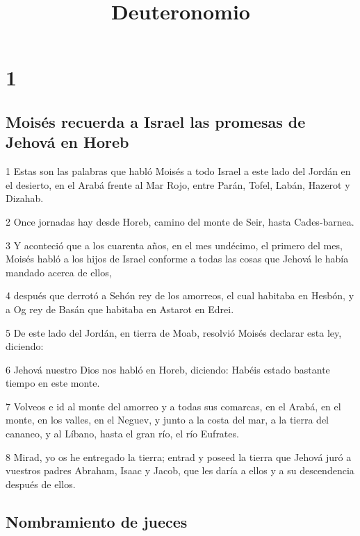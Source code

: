 

\title{Deuteronomio}

\chapter{1}

\section{Moisés recuerda a Israel las promesas de Jehová en Horeb}

\par 1 Estas son las palabras que habló Moisés a todo Israel a este lado del Jordán en el desierto, en el Arabá frente al Mar Rojo, entre Parán, Tofel, Labán, Hazerot y Dizahab.
\par 2 Once jornadas hay desde Horeb, camino del monte de Seir, hasta Cades-barnea.
\par 3 Y aconteció que a los cuarenta años, en el mes undécimo, el primero del mes, Moisés habló a los hijos de Israel conforme a todas las cosas que Jehová le había mandado acerca de ellos,
\par 4 después que derrotó a Sehón rey de los amorreos, el cual habitaba en Hesbón, y a Og rey de Basán que habitaba en Astarot en Edrei.
\par 5 De este lado del Jordán, en tierra de Moab, resolvió Moisés declarar esta ley, diciendo:
\par 6 Jehová nuestro Dios nos habló en Horeb, diciendo: Habéis estado bastante tiempo en este monte.
\par 7 Volveos e id al monte del amorreo y a todas sus comarcas, en el Arabá, en el monte, en los valles, en el Neguev, y junto a la costa del mar, a la tierra del cananeo, y al Líbano, hasta el gran río, el río Eufrates.
\par 8 Mirad, yo os he entregado la tierra; entrad y poseed la tierra que Jehová juró a vuestros padres Abraham, Isaac y Jacob, que les daría a ellos y a su descendencia después de ellos.

\section{Nombramiento de jueces }


